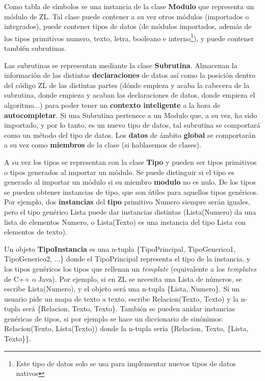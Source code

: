 \documentclass{report}
\begin{document}
	Como tabla de símbolos se una instancia de la clase \textbf{Modulo} que representa un módulo de ZL. Tal clase puede contener a su vez otros módulos (importados o integrados), puede contener tipos de datos (de módulos importados, además de los tipos primitivos numero, texto, letra, booleano e interno\footnote{Este tipo de datos solo se usa para implementar nuevos tipos de datos nativos}), y puede contener también subrutinas.
	
	\vspace{10px}
	
	Las subrutinas se representan mediante la clase \textbf{Subrutina}. Almacenan la información de las distintas \textbf{declaraciones} de datos así como la posición dentro del código ZL de las distintas partes (dónde empieza y acaba la cabecera de la subrutina, donde empieza y acaban las declaraciones de datos, donde empieza el algoritmo...) para poder tener un \textbf{contexto inteligente} a la hora de \textbf{autocompletar}. Si una Subrutina pertenece a un Modulo que, a su vez, ha sido importado, y por lo tanto, es un nuevo tipo de datos, tal subrutina se comportará como un método del tipo de datos. Los \textbf{datos} de ámbito \textbf{global} se comportarán a su vez como \textbf{miembros} de la clase (si hablasemos de clases). 
	
	\vspace{10px}
	
	A su vez los tipos se representan con la clase \textbf{Tipo} y pueden ser tipos primitivos o tipos generados al importar un módulo. Se puede distinguir si el tipo es generado al importar un módulo si su miembro \textbf{modulo} no es nulo. De los tipos se pueden obtener instancias de tipo, que son útiles para aquellos tipos genéricos. Por ejemplo, dos \textbf{instancias} del \textbf{tipo} primitivo Numero siempre serán iguales, pero el tipo genérico Lista puede dar instancias distintas (Lista(Numero) da una lista de elementos Numero, o Lista(Texto) es una instancia del tipo Lista con elementos de texto). 
	
	\vspace{10px}
	
	Un objeto \textbf{TipoInstancia} es una n-tupla \{TipoPrincipal, TipoGenerico1, TipoGenerico2, ...\} donde el TipoPrincipal representa el tipo de la instancia, y los tipos genéricos los tipos que rellenan un \textit{template} (equivalente a los \textit{templates} de C++ o Java). Por ejemplo, si en ZL se necesita una Lista de números, se escribe Lista(Numero), y el objeto será una n-tupla \{Lista, Numero\}. Si un usuario pide un mapa de texto a texto, escribe Relacion(Texto, Texto) y la n-tupla será \{Relacion, Texto, Texto\}. También se pueden anidar instancias genéricas de tipos, si por ejemplo se hace un diccionario de sinónimos: Relacion(Texto, Lista(Texto)) donde la n-tupla sería \{Relacion, Texto, \{Lista, Texto\}\}.
	
\end{document}
